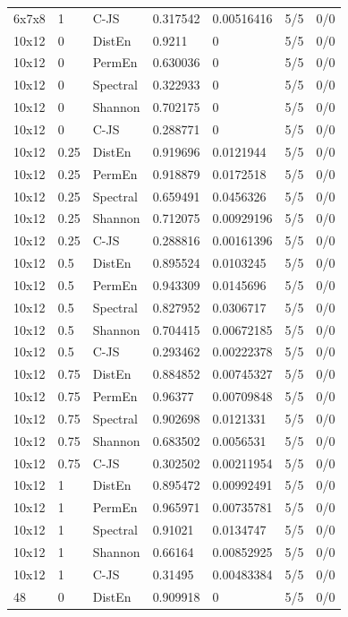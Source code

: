 \documentclass[
  english,
  11pt,
]{article}
\begin{document}
{\begin{longtable}[]{@{}lllllll@{}}
6x7x8 & 1 & C-JS & 0.317542 & 0.00516416 & 5/5 & 0/0 \\
10x12 & 0 & DistEn & 0.9211 & 0 & 5/5 & 0/0 \\
10x12 & 0 & PermEn & 0.630036 & 0 & 5/5 & 0/0 \\
10x12 & 0 & Spectral & 0.322933 & 0 & 5/5 & 0/0 \\
10x12 & 0 & Shannon & 0.702175 & 0 & 5/5 & 0/0 \\
10x12 & 0 & C-JS & 0.288771 & 0 & 5/5 & 0/0 \\
10x12 & 0.25 & DistEn & 0.919696 & 0.0121944 & 5/5 & 0/0 \\
10x12 & 0.25 & PermEn & 0.918879 & 0.0172518 & 5/5 & 0/0 \\
10x12 & 0.25 & Spectral & 0.659491 & 0.0456326 & 5/5 & 0/0 \\
10x12 & 0.25 & Shannon & 0.712075 & 0.00929196 & 5/5 & 0/0 \\
10x12 & 0.25 & C-JS & 0.288816 & 0.00161396 & 5/5 & 0/0 \\
10x12 & 0.5 & DistEn & 0.895524 & 0.0103245 & 5/5 & 0/0 \\
10x12 & 0.5 & PermEn & 0.943309 & 0.0145696 & 5/5 & 0/0 \\
10x12 & 0.5 & Spectral & 0.827952 & 0.0306717 & 5/5 & 0/0 \\
10x12 & 0.5 & Shannon & 0.704415 & 0.00672185 & 5/5 & 0/0 \\
10x12 & 0.5 & C-JS & 0.293462 & 0.00222378 & 5/5 & 0/0 \\
10x12 & 0.75 & DistEn & 0.884852 & 0.00745327 & 5/5 & 0/0 \\
10x12 & 0.75 & PermEn & 0.96377 & 0.00709848 & 5/5 & 0/0 \\
10x12 & 0.75 & Spectral & 0.902698 & 0.0121331 & 5/5 & 0/0 \\
10x12 & 0.75 & Shannon & 0.683502 & 0.0056531 & 5/5 & 0/0 \\
10x12 & 0.75 & C-JS & 0.302502 & 0.00211954 & 5/5 & 0/0 \\
10x12 & 1 & DistEn & 0.895472 & 0.00992491 & 5/5 & 0/0 \\
10x12 & 1 & PermEn & 0.965971 & 0.00735781 & 5/5 & 0/0 \\
10x12 & 1 & Spectral & 0.91021 & 0.0134747 & 5/5 & 0/0 \\
10x12 & 1 & Shannon & 0.66164 & 0.00852925 & 5/5 & 0/0 \\
10x12 & 1 & C-JS & 0.31495 & 0.00483384 & 5/5 & 0/0 \\
48 & 0 & DistEn & 0.909918 & 0 & 5/5 & 0/0 \\

\end{longtable}}
\end{document}
